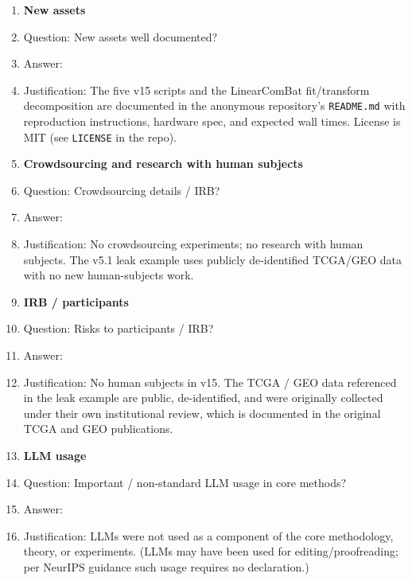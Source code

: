 \begin{enumerate}
\item {\bf New assets}
    \item[] Question: New assets well documented?
    \item[] Answer: \answerYes{}
    \item[] Justification: The five v15 scripts and the LinearComBat fit/transform decomposition are documented in the anonymous repository's \texttt{README.md} with reproduction instructions, hardware spec, and expected wall times. License is MIT (see \texttt{LICENSE} in the repo).

\item {\bf Crowdsourcing and research with human subjects}
    \item[] Question: Crowdsourcing details / IRB?
    \item[] Answer: \answerNA{}
    \item[] Justification: No crowdsourcing experiments; no research with human subjects. The v5.1 leak example uses publicly de-identified TCGA/GEO data with no new human-subjects work.

\item {\bf IRB / participants}
    \item[] Question: Risks to participants / IRB?
    \item[] Answer: \answerNA{}
    \item[] Justification: No human subjects in v15. The TCGA / GEO data referenced in the leak example are public, de-identified, and were originally collected under their own institutional review, which is documented in the original TCGA and GEO publications.

\item {\bf LLM usage}
    \item[] Question: Important / non-standard LLM usage in core methods?
    \item[] Answer: \answerNA{}
    \item[] Justification: LLMs were not used as a component of the core methodology, theory, or experiments. (LLMs may have been used for editing/proofreading; per NeurIPS guidance such usage requires no declaration.)

\end{enumerate}
